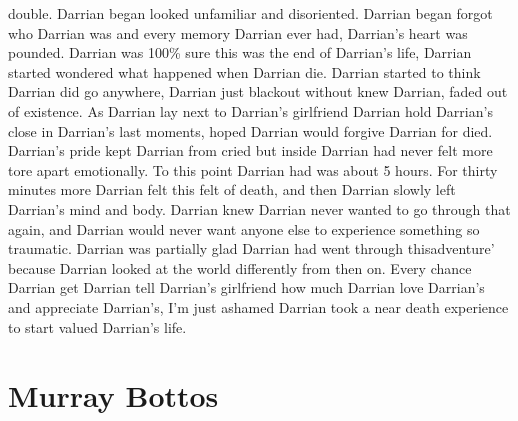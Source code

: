 \documentclass[12pt]{book}
\begin{document}
double. Darrian began looked unfamiliar and disoriented. Darrian began forgot who Darrian was and every memory Darrian ever had, Darrian's heart was pounded. Darrian was 100\% sure this was the end of Darrian's life, Darrian started wondered what happened when Darrian die. Darrian started to think Darrian did go anywhere, Darrian just blackout without knew Darrian, faded out of existence. As Darrian lay next to Darrian's girlfriend Darrian hold Darrian's close in Darrian's last moments, hoped Darrian would forgive Darrian for died. Darrian's pride kept Darrian from cried but inside Darrian had never felt more tore apart emotionally. To this point Darrian had was about 5 hours. For thirty minutes more Darrian felt this felt of death, and then Darrian slowly left Darrian's mind and body. Darrian knew Darrian never wanted to go through that again, and Darrian would never want anyone else to experience something so traumatic. Darrian was partially glad Darrian had went through thisadventure' because Darrian looked at the world differently from then on. Every chance Darrian get Darrian tell Darrian's girlfriend how much Darrian love Darrian's and appreciate Darrian's, I'm just ashamed Darrian took a near death experience to start valued Darrian's life.



\chapter{Murray Bottos}
\end{document}
